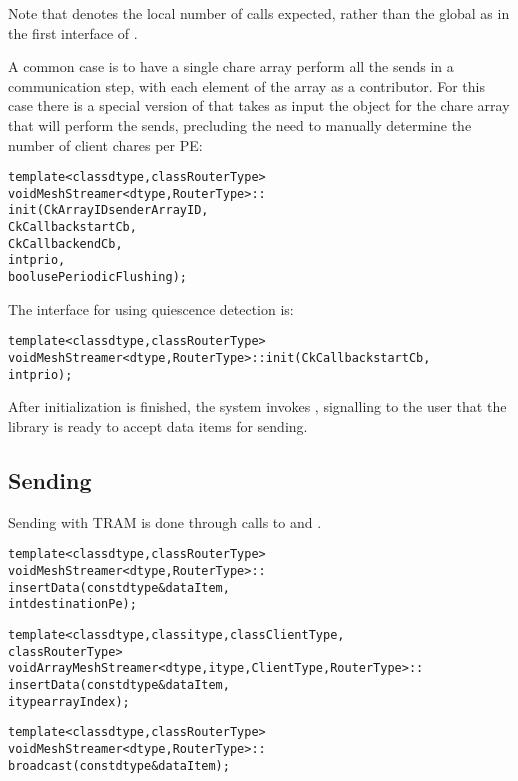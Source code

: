 Note that  denotes the local number of 
calls expected, rather than the global as in the first interface of .

A common case is to have a single chare array perform all the sends in a
communication step, with each element of the array as a contributor. For this
case there is a special version of  that takes as input the
 object for the chare array that will perform the sends,
precluding the need to manually determine the number of client chares per PE:

\begin{alltt}
template <class dtype, class RouterType>
void MeshStreamer<dtype, RouterType>::
init(CkArrayID senderArrayID,
     CkCallback startCb,
     CkCallback endCb,
     int prio,
     bool usePeriodicFlushing);
\end{alltt}

The  interface for using quiescence detection is:

\begin{alltt}
template <class dtype, class RouterType>
void MeshStreamer<dtype, RouterType>::init(CkCallback startCb,
                                           int prio);
\end{alltt}

After initialization is finished, the system invokes ,
signalling to the user that the library is ready to accept data items
for sending.
\\


\subsection{Sending}

Sending with TRAM is done through calls to  and
.

\begin{alltt}
template <class dtype, class RouterType>
void MeshStreamer<dtype, RouterType>::
insertData(const dtype& dataItem,
           int destinationPe);

template <class dtype, class itype, class ClientType,
          class RouterType>
void ArrayMeshStreamer<dtype, itype, ClientType, RouterType>::
insertData(const dtype& dataItem,
           itype arrayIndex);

template <class dtype, class RouterType>
void MeshStreamer<dtype, RouterType>::
broadcast(const dtype& dataItem);
\end{alltt}

